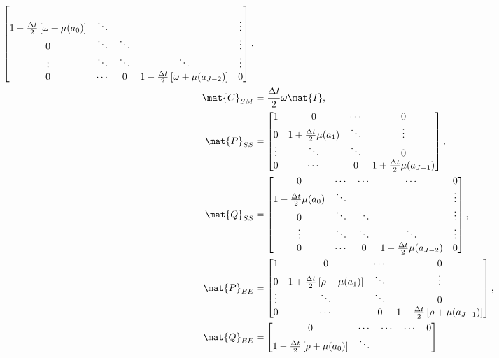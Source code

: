 \documentclass{jpmarticle}
\let\subequationsorig\subequations%
\let\endsubequationsorig\endsubequations%
\renewenvironment{subequations}{
  \subequationsorig
  \renewcommand{\theequation}{\theparentequation.\arabic{equation}}
}{
  \endsubequationsorig
}
\begin{document}
\begin{subequations}
\begin{align}
\begin{bmatrix}
      \\
      1 - \frac{\Delta t}{2} \left[\omega + \mu(a_0)\right] & \ddots &
      & & \vdots
      \\
      0 & \ddots & \ddots & & \vdots
      \\
      \vdots & \ddots & \ddots & \ddots & \vdots
      \\
      0 & \cdots & 0 &
      1 - \frac{\Delta t}{2} \left[\omega + \mu(a_{J - 2})\right] & 0
    \end{bmatrix},
    \\
    \mat{C}_{SM} &=
    \frac{\Delta t}{2} \omega \mat{I},
    \\
    \mat{P}_{SS} &=
    \begin{bmatrix}
      1 & 0 & \cdots & 0
      \\
      0 & 1 + \frac{\Delta t}{2} \mu(a_1) &
      \ddots & \vdots
      \\
      \vdots & \ddots & \ddots & 0
      \\
      0 & \cdots & 0 &
      1 + \frac{\Delta t}{2} \mu(a_{J - 1})
    \end{bmatrix},
    \\
    \mat{Q}_{SS} &=
    \begin{bmatrix}
      0 & \cdots & \cdots & \cdots & 0
      \\
      1 - \frac{\Delta t}{2} \mu(a_0) & \ddots &
      & & \vdots
      \\
      0 & \ddots & \ddots & & \vdots
      \\
      \vdots & \ddots & \ddots & \ddots & \vdots
      \\
      0 & \cdots & 0 &
      1 - \frac{\Delta t}{2} \mu(a_{J - 2}) & 0
    \end{bmatrix},
    \\
    \mat{P}_{EE} &=
    \begin{bmatrix}
      1 & 0 & \cdots & 0
      \\
      0 & 1 + \frac{\Delta t}{2} \left[\rho + \mu(a_1)\right] &
      \ddots & \vdots
      \\
      \vdots & \ddots & \ddots & 0
      \\
      0 & \cdots & 0 &
      1 + \frac{\Delta t}{2} \left[\rho + \mu(a_{J - 1})\right]
    \end{bmatrix},
    \\
    \mat{Q}_{EE} &=
    \begin{bmatrix}
      0 & \cdots & \cdots & \cdots & 0
      \\
      1 - \frac{\Delta t}{2} \left[\rho + \mu(a_0)\right] & \ddots &

\end{bmatrix}
\end{align}
\end{subequations}
\end{document}
